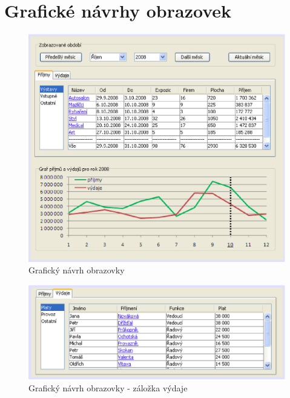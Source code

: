 \pagebreak

\section*{Grafické návrhy obrazovek}
\vspace{-2mm}
\begin{figure}[H]
	\begin{center}
		\includegraphics[width=11.85cm,keepaspectratio]{include/gui_econ_info}
	\end{center}
\vspace{-4mm}
	\caption{Grafický návrh obrazovky }
	\label{fig:GuiEconInfo}
\end{figure}
\vspace{-2mm}
\begin{figure}[H]
	\begin{center}
		\includegraphics[width=11.85cm,keepaspectratio]{include/gui_econ_info2}
	\end{center}
\vspace{-4mm}
	\caption{Grafický návrh obrazovky  - záložka výdaje}
	\label{fig:GuiEconInfo2}
\end{figure}

